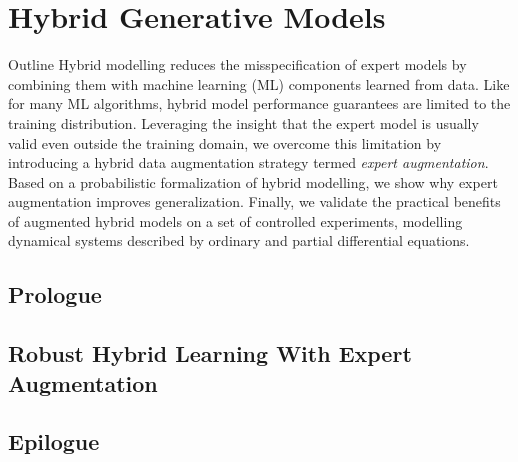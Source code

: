 \chapter{Hybrid Generative Models}\label{ch:07}

\begin{remark}{Outline}
Hybrid modelling reduces the misspecification of expert models by combining them with machine learning (ML) components learned from data. Like for many ML algorithms, hybrid model performance guarantees are limited to the training distribution. Leveraging the insight that the expert model is usually valid even outside the training domain, we overcome this limitation by introducing a hybrid data augmentation strategy termed \textit{expert augmentation}. Based on a probabilistic formalization of hybrid modelling, we show why expert augmentation improves generalization. Finally, we validate the practical benefits of augmented hybrid models on a set of controlled experiments, modelling dynamical systems described by ordinary and partial differential equations.

\end{remark}

\section{Prologue}

\section{Robust Hybrid Learning With Expert Augmentation}


\section{Epilogue}
